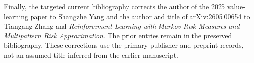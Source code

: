 Finally, the targeted current bibliography corrects the author of the
2025 value-learning paper to Shangzhe Yang and the author and title of
arXiv:2605.00654 to Tiangang Zhang and \emph{Reinforcement Learning with
Markov Risk Measures and Multipattern Risk Approximation}. The prior
entries remain in the preserved bibliography. These corrections use the
primary publisher and preprint records, not an assumed title inferred
from the earlier manuscript.
